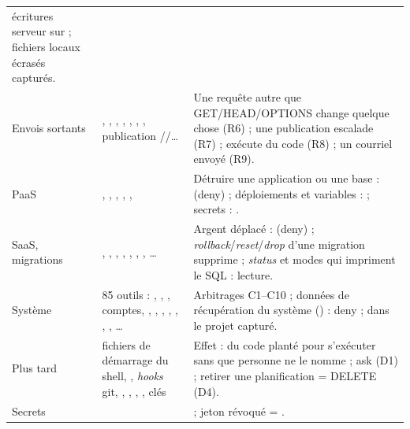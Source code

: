 {\begin{longtable}{@{}L{2.5cm}L{4.4cm}L{8.0cm}@{}}
  écritures serveur sur  ; fichiers locaux écrasés capturés. \\
Envois sortants & , , , , , ,
  , publication //\ldots &
  Une requête autre que GET/HEAD/OPTIONS change quelque chose (R6) ; une publication
  escalade (R7) ;  exécute du code (R8) ; un courriel envoyé (R9). \\
PaaS & , , , , ,  &
  Détruire une application ou une base :  (deny) ; déploiements et
  variables :  ; secrets : . \\
SaaS, migrations & , , , , ,
  , , \ldots & Argent déplacé : 
  (deny) ; \textit{rollback}/\textit{reset}/\textit{drop} d'une migration supprime ;
  \textit{status} et modes qui impriment le SQL : lecture. \\
Système & 85 outils : , , , comptes, ,
  , , , , , ,
  \ldots & Arbitrages C1--C10 ; données de récupération du système
  () : deny ;  dans le projet capturé. \\
Plus tard & fichiers de démarrage du shell, , \textit{hooks} git,
  , , , , clés  &
  Effet  : du code planté pour s'exécuter sans que personne ne le nomme ; ask
  (D1) ; retirer une planification = DELETE (D4). \\
Secrets &  &  ; jeton révoqué = . \\
\end{longtable}
}

